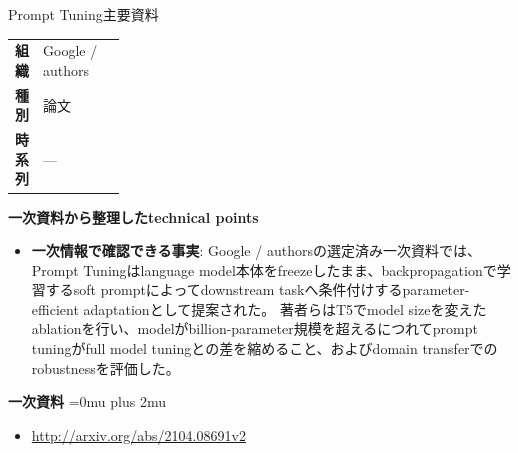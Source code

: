 \begin{technicalnote}{Prompt Tuning}{主要資料}
\begingroup
\begin{tabularx}{\linewidth}{@{}>{\bfseries}p{0.22\linewidth}X@{}}
組織 & Google / authors \\
種別 & 論文 \\
時系列 & — \\
\end{tabularx}
\smallskip
{\bfseries 一次資料から整理したtechnical points}
\begin{itemize}[leftmargin=1.5em,itemsep=0.35em]
\item \textbf{一次情報で確認できる事実}: Google / authorsの選定済み一次資料では、Prompt Tuningはlanguage model本体をfreezeしたまま、backpropagationで学習するsoft promptによってdownstream taskへ条件付けするparameter-efficient adaptationとして提案された。 著者らはT5でmodel sizeを変えたablationを行い、modelがbillion-parameter規模を超えるにつれてprompt tuningがfull model tuningとの差を縮めること、およびdomain transferでのrobustnessを評価した。
\end{itemize}
\begin{minipage}{\linewidth}
\begin{samepage}
{\bfseries 一次資料}
\begingroup\sloppy
\Urlmuskip=0mu plus 2mu\relax
\begin{itemize}[leftmargin=1.5em,itemsep=0.25em]
\item {\scriptsize\url{http://arxiv.org/abs/2104.08691v2}}
\end{itemize}
\endgroup
\end{samepage}
\end{minipage}
\endgroup
\end{technicalnote}
\medskip

